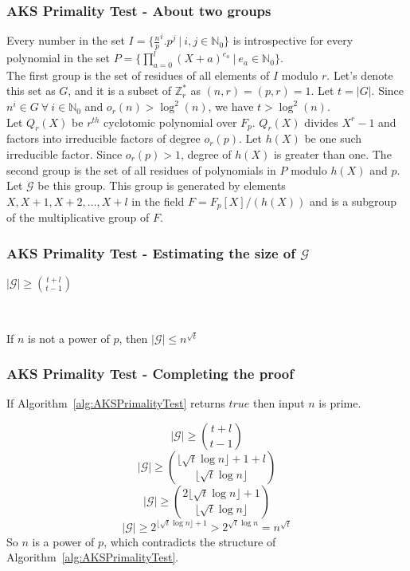 \documentclass{beamer}
\begin{document}
\begin{frame}
\frametitle{AKS Primality Test - About two groups}
Every number in the set $I = \{\frac{n}{p}^i.p^j\ |\ i,j \in \mathbb{N}_0\}$ is introspective for every polynomial in the set $P = \{\prod_{a=0}^{l}{(X+a)^{e_a}}\ |\ e_a \in \mathbb{N}_0\}$.
\\[3mm]
The first group is the set of residues of all elements of $I$ modulo $r$. Let's denote this set as $G$, and it is a subset of $\mathbb{Z}_r^*$ as $(n,r) = (p,r) = 1$. Let $t = |G|$. Since $n^i \in G \ \forall \ i \in \mathbb{N}_0$ and $o_r(n) > \log^2(n)$, we have $t > \log^2(n)$.
\\[3mm]
Let $Q_r(X)$ be $r^{th}$ cyclotomic polynomial over $F_p$. $Q_r(X)$ divides $X^r-1$ and factors into irreducible factors of degree $o_r(p)$. Let $h(X)$ be one such irreducible factor. Since $o_r(p) > 1$, degree of $h(X)$ is greater than one. The second group is the set of all residues of polynomials in $P$ modulo $h(X)$ and $p$. Let $\mathcal{G}$ be this group. This group is generated by elements $X, X + 1, X + 2, \dots, X + l$ in the field $F = F_p[X]/(h(X))$ and is a subgroup of the multiplicative group of $F$.
\end{frame}

\begin{frame}
\frametitle{AKS Primality Test - Estimating the size of $\mathcal{G}$}
\begin{lemma}
[Lenstra]\label{lemma:GLowerBound}
$|\mathcal{G}| \geq {{t+l} \choose {t-1}}$
\end{lemma}
\ 
\\[3mm]
\begin{lemma}
\label{lemma:GUpperBound}
If $n$ is not a power of $p$, then $|\mathcal{G}| \leq n^{\sqrt{t}}$
\end{lemma}
\end{frame}

\begin{frame}
\frametitle{AKS Primality Test - Completing the proof}
\begin{theorem}
If Algorithm~\ref{alg:AKSPrimalityTest} returns $true$ then input $n$ is prime.
\end{theorem}
\[|\mathcal{G}| \geq {{t+l} \choose {t-1}}\]
\[|\mathcal{G}| \geq {{{\lfloor \sqrt t \log n \rfloor} + 1 + l} \choose {\lfloor \sqrt t \log n \rfloor}}\]
\[|\mathcal{G}| \geq {{2{\lfloor \sqrt t \log n \rfloor}+1} \choose {\lfloor \sqrt t \log n \rfloor}}\]
\[|\mathcal{G}| \geq 2^{{\lfloor \sqrt t \log n \rfloor}+1} > 2^{\sqrt t \log n} = n^{\sqrt t}\]
So $n$ is a power of $p$, which contradicts the structure of Algorithm~\ref{alg:AKSPrimalityTest}.

\end{frame}
\end{document}

